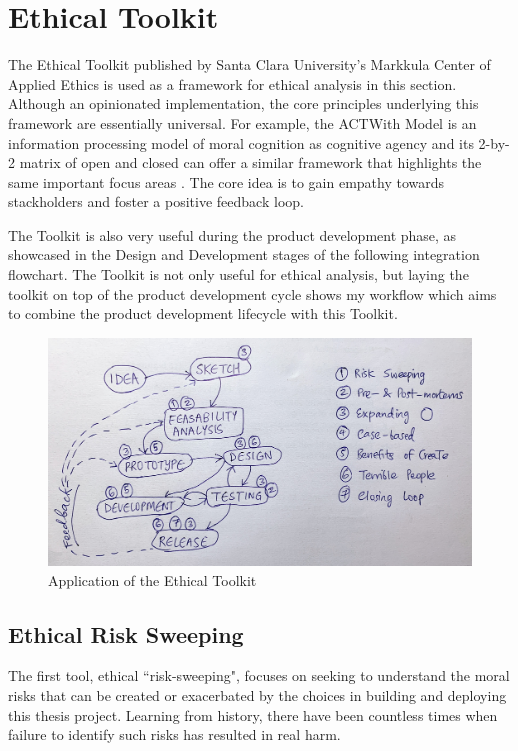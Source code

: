 \documentclass{article}
\begin{document}
\section{Ethical Toolkit}

The Ethical Toolkit published by Santa Clara University's Markkula Center of Applied Ethics is used as a framework for ethical analysis in this section. Although an opinionated implementation, the core principles underlying this framework are essentially universal. For example, the ACTWith Model is an information processing model of moral cognition as cognitive agency and its 2-by-2 matrix of open and closed can offer a similar framework that highlights the same important focus areas \cite{white_understanding_2010}. The core idea is to gain empathy towards stackholders and foster a positive feedback loop.

The Toolkit is also very useful during the product development phase, as showcased in the Design and Development stages of the following integration flowchart. The Toolkit is not only useful for ethical analysis, but laying the toolkit on top of the product development cycle shows my workflow which aims to combine the product development lifecycle with this Toolkit.

\begin{figure}[h]
 \centering
 \includegraphics[width=1\textwidth]{cycle.jpg}
 \caption{Application of the Ethical Toolkit}
 \label{fig:checkbox}
\end{figure}

\subsection{Ethical Risk Sweeping}

The first tool, ethical ``risk-sweeping", focuses on seeking to understand the moral risks that can be created or exacerbated by the choices in building and deploying this thesis project. Learning from history, there have been countless times when failure to identify such risks has resulted in real harm.
\end{document}
